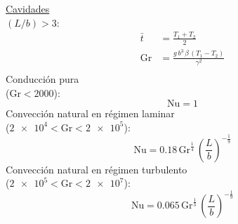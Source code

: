 \documentclass[letter,oneside,10pt]{article}
\begin{document}
\begin{multicols}{3}
\underline{Cavidades}\\
$(L/b)>3$:
\begin{equation*}
    \begin{split}
        \bar{t} &= \frac{T_1 + T_2}{2}\\
        \text{Gr} &= \frac{g\,b^3\,\beta\,(T_1 - T_2)}{\gamma^2}\\
    \end{split}
\end{equation*}
Conducción pura\\
($\text{Gr}<2000$):
\begin{equation*}
    \text{Nu} = 1
\end{equation*}
Convección natural en régimen laminar\\
($\num{2e4} < \text{Gr} < \num{2e5}$):
\begin{equation*}
    \text{Nu} = 0.18\,\text{Gr}^{\frac{1}{4}}\,
    \left(\frac{L}{b}\right)^{-\frac{1}{9}}
\end{equation*}
Convección natural en régimen turbulento\\
($\num{2e5} < \text{Gr} < \num{2e7}$):
\begin{equation*}
    \text{Nu} = 0.065\,\text{Gr}^{\frac{1}{3}}\,
    \left(\frac{L}{b}\right)^{-\frac{1}{9}}
\end{equation*}

\end{multicols}
\end{document}
